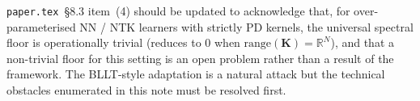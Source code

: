 \documentclass[11pt,a4paper]{article}
\theoremstyle{plain}
\theoremstyle{definition}
\theoremstyle{remark}
\newcommand{\bK}{\mathbf{K}}
\newcommand{\R}{\mathbb{R}}
\newcommand{\range}{\mathrm{range}}
\begin{document}
\texttt{paper.tex}~\S8.3 item~(4) should be updated to acknowledge
that, for over-parameterised NN / NTK learners with strictly PD
kernels, the universal spectral floor is operationally trivial
(reduces to $0$ when $\range(\bK) = \R^N$), and that a non-trivial
floor for this setting is an open problem rather than a result of
the framework. The BLLT-style adaptation is a natural attack but
the technical obstacles enumerated in this note must be resolved
first.


\end{document}
